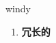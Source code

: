 
\begin{frame}
{\huge windy}
\begin{center}
\begin{enumerate}\Large
  \item \textbf{冗长的}
\end{enumerate}
\end{center}
\end{frame}
